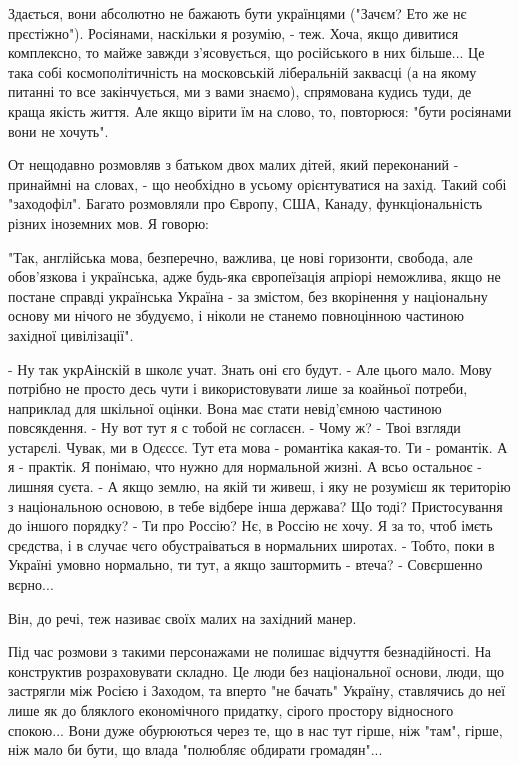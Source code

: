 Здається, вони абсолютно не бажають бути українцями ("Зачєм? Ето же нє
прєстіжно"). Росіянами, наскільки я розумію, - теж. Хоча, якщо дивитися
комплексно, то майже завжди з'ясовується, що російського в них більше... Це
така собі  космополітичність на московській ліберальній заквасці (а на якому
питанні то все закінчується, ми з вами знаємо), спрямована кудись туди, де
краща якість життя. Але якщо вірити їм на слово, то, повторюся: "бути росіянами
вони не хочуть".

От нещодавно розмовляв з батьком двох малих дітей, який переконаний - принаймні
на словах, - що необхідно в усьому орієнтуватися на захід. Такий собі
"заходофіл". Багато розмовляли про Європу, США, Канаду, функціональність різних
іноземних мов. Я говорю:

"Так, англійська мова, безперечно, важлива, це нові горизонти, свобода, але
обов'язкова і українська, адже будь-яка європеїзація апріорі неможлива, якщо не
постане справді українська Україна - за змістом, без вкорінення у національну
основу ми нічого не збудуємо, і ніколи не станемо повноцінною частиною західної
цивілізації". 

\obeycr
- Ну так укрАінскій в школє учат. Знать оні єго будут.
- Але цього мало. Мову потрібно не просто десь чути і використовувати лише за коайньої потреби, наприклад для шкільної оцінки. Вона має стати невід'ємною частиною повсякдення.
- Ну вот тут я с тобой нє согласєн.
- Чому ж?
- Твоі взгляди устарєлі. Чувак, ми в Одєссє. Тут ета мова - романтіка какая-то. Ти - романтік. А я - практік. Я понімаю, что нужно для нормальной жизні. А всьо остальноє - лишняя суєта.
- А якщо землю, на якій ти живеш, і яку не розумієш як територію з національною основою, в тебе відбере інша держава? Що тоді? Пристосування до іншого порядку?
- Ти про Россію? Нє, в Россію нє хочу. Я за то, чтоб імєть срєдства, і в случає чєго обустраіваться в нормальних широтах.
- Тобто, поки в Україні умовно нормально, ти тут, а якщо заштормить - втеча?
- Совєршенно вєрно...
\restorecr

Він, до речі, теж називає своїх  малих на західний манер. 

Під час розмови з такими персонажами не полишає відчуття безнадійності. На
конструктив розраховувати складно. Це люди без національної основи, люди, що
застрягли між Росією і Заходом, та вперто "не бачать" Україну, ставлячись до
неї лише як до бляклого економічного придатку, сірого простору відносного
спокою... Вони дуже обурюються через те, що в нас тут гірше, ніж "там", гірше,
ніж мало би бути, що влада "полюбляє обдирати громадян"...

